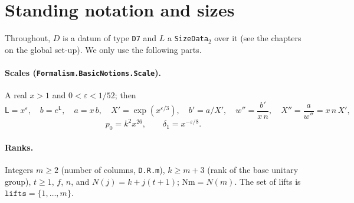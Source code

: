 
\section{Standing notation and sizes}\label{sec:G-notation}

Throughout, $D$ is a datum of type \texttt{D7} and $L$ a \texttt{SizeData}$_2$ over it (see the chapters on the
global set-up). We only use the following parts.

\paragraph{Scales (\texttt{Formalism.BasicNotions.Scale}).} A real $x>1$ and $0<\varepsilon<1/52$; then
\[
  \mathsf L=x^{\varepsilon},\quad b=e^{\mathsf L},\quad a=x\,b,\quad X'=\exp(x^{\varepsilon/3}),\quad
  b'=a/X',\quad w''=\frac{b'}{x\,n},\quad X''=\frac{a}{w''}=x\,n\,X',
\]
\[
  p_0=k^{2}x^{26},\qquad \delta_1=x^{-\varepsilon/8}.
\]
\paragraph{Ranks.} Integers $m\ge 2$ (number of columns, \texttt{D.R.m}), $k\ge m+3$ (rank of the base
unitary group), $t\ge 1$, $f$, $n$, and $N(j)=k+j(t+1)$; $\mathrm{Nm}=N(m)$. The set of lifts is
$\texttt{lifts}=\{1,\dots,m\}$.


